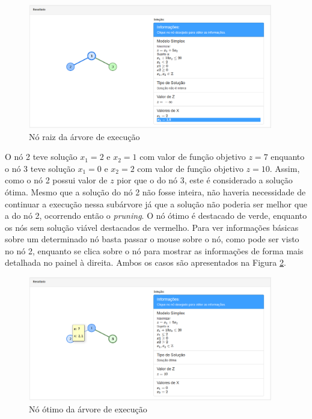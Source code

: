 \documentclass [11pt]{articleSBPO}
\begin{document}
\begin{figure}[!h]
	\centering
	\includegraphics[width=0.95\textwidth]{img/bbno1.png}
	\caption[]{Nó raiz da árvore de execução}
	\label{fig:bbno1}
\end{figure}

O nó 2 teve solução $x_{1}=2$ e $x_{2}=1$ com valor de função objetivo $z = 7$ enquanto o nó 3 teve solução $x_{1}=0$ e $x_{2}=2$ com valor de função objetivo $z = 10$. Assim, como o nó 2 possui valor de $z$ pior que o do nó 3, este é considerado a solução ótima. Mesmo que a solução do nó 2 não fosse inteira, não haveria necessidade de continuar a execução nessa subárvore já que a solução não poderia ser melhor que a do nó 2, ocorrendo então o \textit{pruning}. O nó ótimo é destacado de verde, enquanto os nós sem solução viável destacados de vermelho. Para ver informações básicas sobre um determinado nó basta passar o mouse sobre o nó, como pode ser visto no nó 2, enquanto se clica sobre o nó para mostrar as informações de forma mais detalhada no painel à direita. Ambos os casos são apresentados na Figura \ref{fig:bbno3}.

\begin{figure}[!h]
	\centering
	\includegraphics[width=0.95\textwidth]{img/bbno3.png}
	\caption[]{Nó ótimo da árvore de execução}
	\label{fig:bbno3}
\end{figure}
\end{document}
